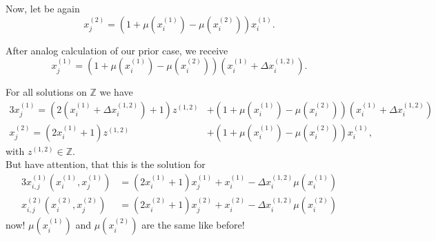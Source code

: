 Now, let be again
\begin{equation}
	x_{j}^{\left(2\right)} = \left(1 + \mu\left(x_{i}^{\left(1\right)}\right) - \mu\left(x_{i}^{\left(2\right)}\right)\right)x_{i}^{\left(1\right)}.
\label{eq:solxj2deltagen}
\end{equation}

After analog calculation of our prior case, we receive
\begin{equation}
	x_{j}^{\left(1\right)} = \left(1 + \mu\left(x_{i}^{\left(1\right)}\right) - \mu\left(x_{i}^{\left(2\right)}\right)\right)\left(x_{i}^{\left(1\right)} + \Delta x_{i}^{\left(1,2\right)}\right).
\label{eq:solxj1deltagen}
\end{equation}

For all solutions on $\mathbb{Z}$ we have
\begin{alignat}{3}
	x_{j}^{\left(1\right)} = \left(2\left(x_{i}^{\left(1\right)} + \Delta x_{i}^{\left(1,2\right)}\right) + 1\right)z^{\left(1,2\right)} &+ \left(1 + \mu\left(x_{i}^{\left(1\right)}\right) - \mu\left(x_{i}^{\left(2\right)}\right)\right)\left(x_{i}^{\left(1\right)} + \Delta x_{i}^{\left(1,2\right)}\right) \label{eq:solxj1deltagen_all} \\
	x_{j}^{\left(2\right)} = \left(2x_{i}^{\left(1\right)} + 1\right)z^{\left(1,2\right)} &+ \left(1 + \mu\left(x_{i}^{\left(1\right)}\right) - \mu\left(x_{i}^{\left(2\right)}\right)\right)x_{i}^{\left(1\right)} \label{eq:solxj2deltagen_all},
\end{alignat}
with $z^{\left(1,2\right)} \in \mathbb{Z}$.\\

But have attention, that this is the solution for 
\begin{alignat}{3}
	x_{i,j}^{\left(1\right)}\left(x_{i}^{\left(1\right)}, x_{j}^{\left(1\right)}\right) &= \left(2x_{i}^{\left(1\right)} + 1\right)x_{j}^{\left(1\right)} + x_{i}^{\left(1\right)} - \Delta x_{i}^{\left(1,2\right)}\mu\left(x_{i}^{\left(1\right)}\right) \label{eq:xijeq_new1} \\
	x_{i,j}^{\left(2\right)}\left(x_{i}^{\left(2\right)}, x_{j}^{\left(2\right)}\right) &= \left(2x_{i}^{\left(2\right)} + 1\right)x_{j}^{\left(2\right)} + x_{i}^{\left(2\right)} - \Delta x_{i}^{\left(1,2\right)}\mu\left(x_{i}^{\left(2\right)}\right) \label{eq:xijeq_new2}
\end{alignat}
now! $\mu\left(x_{i}^{\left(1\right)}\right)$ and $\mu\left(x_{i}^{\left(2\right)}\right)$ are the same like before!


















